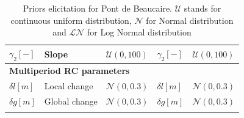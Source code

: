 \documentclass[11pt]{article}
\begin{document}
\begin{table}[h!]
\begin{tabular}{|l|l|l|l|l|}
            $\gamma_{2} [-]$ & Slope & $\mathcal{U}(0,100)$ & $\gamma_{2} [-]$ &$\mathcal{U}(0,100)$  \\
            \hline
            \multicolumn{5}{|l|}{\textbf{Multiperiod RC parameters}} \\
            $\delta l [m]$     &   Local change    &  $\mathcal{N}(0,0.3)$&      $\delta l [m]$     &$\mathcal{N}(0,0.3)$\\
            $\delta g [m]$     &   Global change       &  $\mathcal{N}(0,0.3)$&      $\delta g [m]$     &$\mathcal{N}(0,0.3)$\\
            \lasthline
            \end{tabular} 
            \caption{Priors elicitation for Pont de Beaucaire. $\mathcal{U}$ stands for continuous uniform distribution, $\mathcal{N}$ for Normal distribution and $\mathcal{LN}$ for Log Normal distribution}
            \label{tab:PriorPt}
       \end{table}
       
    
\end{document}
